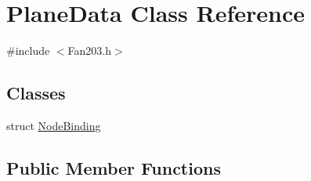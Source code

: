 \hypertarget{class_plane_data}{}\section{Plane\+Data Class Reference}
\label{class_plane_data}


{\ttfamily \#include $<$Fan203.\+h$>$}

\subsection*{Classes}
\begin{DoxyCompactItemize}
\item 
struct \hyperlink{struct_plane_data_1_1_node_binding}{Node\+Binding}
\end{DoxyCompactItemize}
\subsection*{Public Member Functions}
